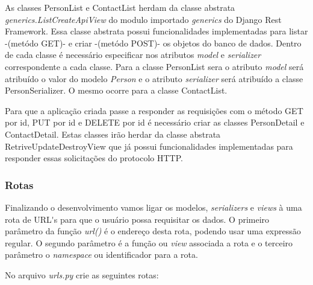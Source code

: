   As classes PersonList e ContactList herdam da classe abstrata \textit{generics.ListCreateApiView} do modulo
  importado \textit{generics} do Django Rest Framework. Essa classe abstrata possui funcionalidades implementadas para 
  listar -(metódo GET)- e criar -(metódo POST)- os objetos do banco de dados. Dentro de cada classe é necessário especificar
  nos atributos \textit{model} e \textit{serializer} correspondente a cada classe. Para a classe PersonList sera o atributo
  \textit{model} será atribuído o valor do modelo \textit{Person} e o atributo \textit{serializer} será atribuído a classe PersonSerializer. 
  O mesmo ocorre para a classe ContactList.
  
  Para que a aplicação criada passe a responder as requisições com o método GET por id, PUT por id e DELETE por id é necessário criar
  as classes PersonDetail e ContactDetail. Estas classes irão herdar da classe abstrata RetriveUpdateDestroyView que já possui 
  funcionalidades implementadas para responder essas solicitações do protocolo \ac{HTTP}.

\subsubsection{Rotas}

  Finalizando o desenvolvimento vamos ligar os modelos, \textit{serializers} e \textit{views} à uma rota de URL\'{}s para que o usuário
  possa requisitar os dados. O primeiro parâmetro da função \textit{url()} é o endereço desta rota, podendo
  usar uma expressão regular. O segundo parâmetro é a função ou \textit{view} associada a rota e o terceiro
  parâmetro o \textit{namespace} ou identificador para a rota.
  
  No arquivo \textit{urls.py} crie as seguintes rotas:
  
